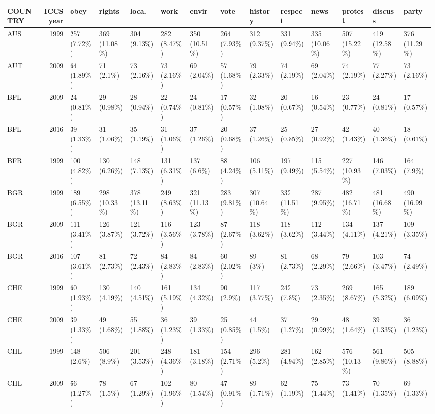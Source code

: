 \documentclass[]{article}
\begin{document}
\begin{longtable}[]{@{}lrllllllllllll@{}}
\toprule
COUNTRY & ICCS\_year & obey & rights & local & work & envir & vote &
history & respect & news & protest & discuss & party\tabularnewline
\midrule
\endhead
AUS & 1999 & 257 (7.72\%) & 369 (11.08\%) & 304 (9.13\%) & 282 (8.47\%)
& 350 (10.51\%) & 264 (7.93\%) & 312 (9.37\%) & 331 (9.94\%) & 335
(10.06\%) & 507 (15.22\%) & 419 (12.58\%) & 376 (11.29\%)\tabularnewline
AUT & 2009 & 64 (1.89\%) & 71 (2.1\%) & 73 (2.16\%) & 73 (2.16\%) & 69
(2.04\%) & 57 (1.68\%) & 79 (2.33\%) & 74 (2.19\%) & 69 (2.04\%) & 74
(2.19\%) & 77 (2.27\%) & 73 (2.16\%)\tabularnewline
BFL & 2009 & 24 (0.81\%) & 29 (0.98\%) & 28 (0.94\%) & 22 (0.74\%) & 24
(0.81\%) & 17 (0.57\%) & 32 (1.08\%) & 20 (0.67\%) & 16 (0.54\%) & 23
(0.77\%) & 24 (0.81\%) & 17 (0.57\%)\tabularnewline
BFL & 2016 & 39 (1.33\%) & 31 (1.06\%) & 35 (1.19\%) & 31 (1.06\%) & 37
(1.26\%) & 20 (0.68\%) & 37 (1.26\%) & 25 (0.85\%) & 27 (0.92\%) & 42
(1.43\%) & 40 (1.36\%) & 18 (0.61\%)\tabularnewline
BFR & 1999 & 100 (4.82\%) & 130 (6.26\%) & 148 (7.13\%) & 131 (6.31\%) &
137 (6.6\%) & 88 (4.24\%) & 106 (5.11\%) & 197 (9.49\%) & 115 (5.54\%) &
227 (10.93\%) & 146 (7.03\%) & 164 (7.9\%)\tabularnewline
BGR & 1999 & 189 (6.55\%) & 298 (10.33\%) & 378 (13.11\%) & 249 (8.63\%)
& 321 (11.13\%) & 283 (9.81\%) & 307 (10.64\%) & 332 (11.51\%) & 287
(9.95\%) & 482 (16.71\%) & 481 (16.68\%) & 490 (16.99\%)\tabularnewline
BGR & 2009 & 111 (3.41\%) & 126 (3.87\%) & 121 (3.72\%) & 116 (3.56\%) &
123 (3.78\%) & 87 (2.67\%) & 118 (3.62\%) & 118 (3.62\%) & 112 (3.44\%)
& 134 (4.11\%) & 137 (4.21\%) & 109 (3.35\%)\tabularnewline
BGR & 2016 & 107 (3.61\%) & 81 (2.73\%) & 72 (2.43\%) & 84 (2.83\%) & 84
(2.83\%) & 60 (2.02\%) & 89 (3\%) & 81 (2.73\%) & 68 (2.29\%) & 79
(2.66\%) & 103 (3.47\%) & 74 (2.49\%)\tabularnewline
CHE & 1999 & 60 (1.93\%) & 130 (4.19\%) & 140 (4.51\%) & 161 (5.19\%) &
134 (4.32\%) & 90 (2.9\%) & 117 (3.77\%) & 242 (7.8\%) & 73 (2.35\%) &
269 (8.67\%) & 165 (5.32\%) & 189 (6.09\%)\tabularnewline
CHE & 2009 & 39 (1.33\%) & 49 (1.68\%) & 55 (1.88\%) & 36 (1.23\%) & 39
(1.33\%) & 25 (0.85\%) & 44 (1.5\%) & 37 (1.27\%) & 29 (0.99\%) & 48
(1.64\%) & 39 (1.33\%) & 36 (1.23\%)\tabularnewline
CHL & 1999 & 148 (2.6\%) & 506 (8.9\%) & 201 (3.53\%) & 248 (4.36\%) &
181 (3.18\%) & 154 (2.71\%) & 296 (5.2\%) & 281 (4.94\%) & 162 (2.85\%)
& 576 (10.13\%) & 561 (9.86\%) & 505 (8.88\%)\tabularnewline
CHL & 2009 & 66 (1.27\%) & 78 (1.5\%) & 67 (1.29\%) & 102 (1.96\%) & 80
(1.54\%) & 47 (0.91\%) & 89 (1.71\%) & 62 (1.19\%) & 75 (1.44\%) & 73
(1.41\%) & 70 (1.35\%) & 69 (1.33\%)\tabularnewline

\end{longtable}
\end{document}
